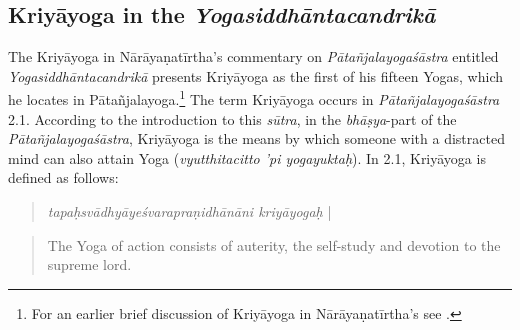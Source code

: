 \subsection{Kriyāyoga in the \textit{Yogasiddhāntacandrikā}}

The Kriyāyoga in Nārāyaṇatīrtha's commentary on \textit{Pātañjalayogaśāstra} entitled \textit{Yogasiddhāntacandrikā} presents Kriyāyoga as the first of his fifteen Yogas, which he locates in Pātañjalayoga.\footnote{For an earlier brief discussion of Kriyāyoga in Nārāyaṇatīrtha's  see \citeauthor[2004: 62-66]{penna2004}.} The term Kriyāyoga occurs in \textit{Pātañjalayogaśāstra} 2.1. According to the introduction to this \textit{sūtra}, in the \textit{bhāṣya}-part of the \textit{Pātañjalayogaśāstra}, Kriyāyoga is the means by which someone with a distracted mind can also attain Yoga (\textit{vyutthitacitto 'pi yogayuktaḥ}). In  2.1, Kriyāyoga is defined as follows:
\begin{quote}  
  \textit{tapaḥsvādhyāyeśvarapraṇidhānāni kriyāyogaḥ} |
\end{quote}
\begin{quote}
The Yoga of action consists of auterity, the self-study and devotion to the supreme lord. 
\end{quote}


